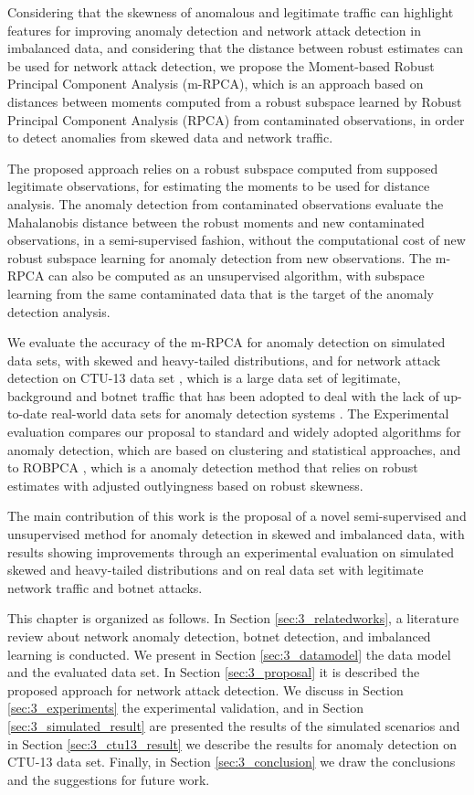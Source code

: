 Considering that the skewness of anomalous and legitimate traffic can highlight features for improving anomaly detection and network attack detection in imbalanced data, and considering that the distance between robust estimates can be used for network attack detection, we propose the Moment-based Robust Principal Component Analysis (m-RPCA), which is an approach based on distances between moments computed from a robust subspace learned by Robust Principal Component Analysis (RPCA) from contaminated observations, in order to detect anomalies from skewed data and network traffic. 

The proposed approach relies on a robust subspace computed from supposed legitimate observations, for estimating the moments to be used for distance analysis. The anomaly detection from contaminated observations evaluate the Mahalanobis distance between the robust moments and new contaminated observations, in a semi-supervised fashion, without the computational cost of new robust subspace learning for anomaly detection from new observations. The m-RPCA can also be computed as an unsupervised algorithm, with subspace learning from the same contaminated data that is the target of the anomaly detection analysis.

We evaluate the accuracy of the m-RPCA for anomaly detection on simulated data sets, with skewed and heavy-tailed distributions, and for network attack detection on CTU-13 data set \cite{garcia2014empirical}, which is a large data set of legitimate, background and botnet traffic that has been adopted to deal with the lack of up-to-date real-world data sets for anomaly detection systems \cite{osanaiye2016distributed}. The Experimental evaluation compares our proposal to standard and widely adopted algorithms for anomaly detection, which are based on clustering and statistical approaches, and to ROBPCA \cite{hubert2005robpca}, which is a anomaly detection method that relies on robust estimates with adjusted outlyingness based on robust skewness.

The main contribution of this work is the proposal of a novel semi-supervised and unsupervised method for anomaly detection in skewed and imbalanced data, with results showing improvements through an experimental evaluation on simulated skewed and heavy-tailed distributions and on real data set with legitimate network traffic and botnet attacks.

This chapter is organized as follows. In Section \ref{sec:3_relatedworks}, a literature review about network anomaly detection, botnet detection, and imbalanced learning is conducted. We present in Section \ref{sec:3_datamodel} the data model and the evaluated data set. In Section \ref{sec:3_proposal} it is described the proposed approach for network attack detection. We discuss in Section \ref{sec:3_experiments} the experimental validation, and in Section \ref{sec:3_simulated_result} are presented the results of the simulated scenarios and in Section \ref{sec:3_ctu13_result} we describe the results for anomaly detection on CTU-13 data set. Finally, in Section \ref{sec:3_conclusion} we draw the conclusions and the suggestions for future work.


